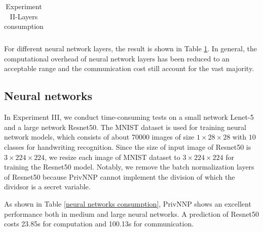 \documentclass[letterpaper]{article} %
\begin{document}
\begin{table}[!ht]
{\begin{tabular}{|c|c|c|c|c|c|}
        \end{tabular}}

        \caption{Experiment II-Layers consumption}
        \label{Layers_consumption}
    \end{table}


    For different neural network layers,
    the result is shown in Table \ref{Layers_consumption}.
    In general, the computational overhead of neural network layers has been reduced to an acceptable range
    and the communication cost still account for the vast majority.




    \subsection{Neural networks}
    In Experiment III, we conduct
    time-consuming tests on a small network Lenet-5 \cite{Lenet5} and a large network Resnet50\cite{DeepResidualLearning}.
    The MNIST dataset \cite{MNIST} is used for training neural network models, which consists of about 70000 images of size $1\times 28 \times 28$ with $10$ classes
    for handwriting recognition.
    Since the size of input image of Resnet50 is $3\times 224 \times 224$,
    we resize each image of MNIST dataset to $3\times 224 \times 224$ for training the Resnet50 model.
    Notably, we remove the batch normalization layers of Resnet50 because PrivNNP
    cannot implement the division of which the dividsor is a secret variable.


    \begin{table}[!ht]
        \center
        \caption{Experiment III-Neural networks consumption}
        \label{neural networks consumption}
    \end{table}

    As shown in Table \ref{neural networks consumption}, PrivNNP shows an excellent performance
    both in medium and large neural networks.
    A prediction of Resnet50 costs 23.85s for computation and 100.13s for communication.
\end{document}
